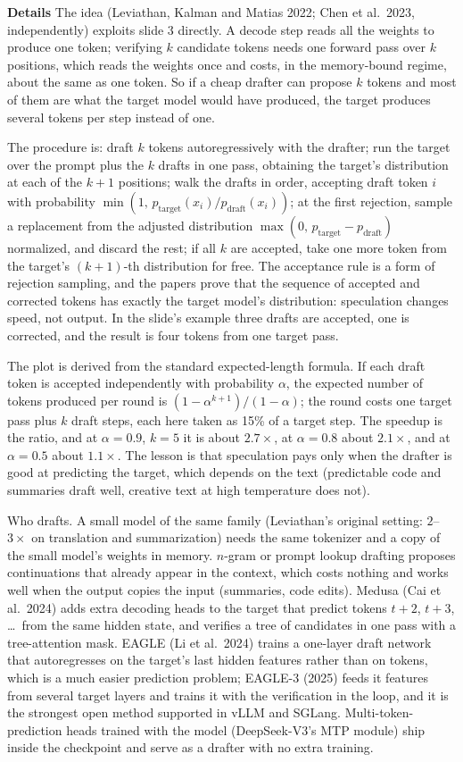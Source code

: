 \documentclass[11pt,letterpaper]{article}
\newcommand{\para}[1]{\medskip\noindent\textbf{#1}\quad}
\begin{document}
\para{Details} The idea (Leviathan, Kalman and Matias 2022; Chen et al.\ 2023, independently) exploits slide 3 directly. A decode step reads all the weights to produce one token; verifying $k$ candidate tokens needs one forward pass over $k$ positions, which reads the weights once and costs, in the memory-bound regime, about the same as one token. So if a cheap drafter can propose $k$ tokens and most of them are what the target model would have produced, the target produces several tokens per step instead of one.

The procedure is: draft $k$ tokens autoregressively with the drafter; run the target over the prompt plus the $k$ drafts in one pass, obtaining the target's distribution at each of the $k+1$ positions; walk the drafts in order, accepting draft token $i$ with probability $\min(1,\,p_{\text{target}}(x_i)/p_{\text{draft}}(x_i))$; at the first rejection, sample a replacement from the adjusted distribution $\max(0,\,p_{\text{target}}-p_{\text{draft}})$ normalized, and discard the rest; if all $k$ are accepted, take one more token from the target's $(k+1)$-th distribution for free. The acceptance rule is a form of rejection sampling, and the papers prove that the sequence of accepted and corrected tokens has exactly the target model's distribution: speculation changes speed, not output. In the slide's example three drafts are accepted, one is corrected, and the result is four tokens from one target pass.

The plot is derived from the standard expected-length formula. If each draft token is accepted independently with probability $\alpha$, the expected number of tokens produced per round is $(1-\alpha^{k+1})/(1-\alpha)$; the round costs one target pass plus $k$ draft steps, each here taken as 15\% of a target step. The speedup is the ratio, and at $\alpha=0.9$, $k=5$ it is about $2.7\times$, at $\alpha=0.8$ about $2.1\times$, and at $\alpha=0.5$ about $1.1\times$. The lesson is that speculation pays only when the drafter is good at predicting the target, which depends on the text (predictable code and summaries draft well, creative text at high temperature does not).

Who drafts. A small model of the same family (Leviathan's original setting: $2$--$3\times$ on translation and summarization) needs the same tokenizer and a copy of the small model's weights in memory. $n$-gram or prompt lookup drafting proposes continuations that already appear in the context, which costs nothing and works well when the output copies the input (summaries, code edits). Medusa (Cai et al.\ 2024) adds extra decoding heads to the target that predict tokens $t+2$, $t+3$, \ldots\ from the same hidden state, and verifies a tree of candidates in one pass with a tree-attention mask. EAGLE (Li et al.\ 2024) trains a one-layer draft network that autoregresses on the target's last hidden features rather than on tokens, which is a much easier prediction problem; EAGLE-3 (2025) feeds it features from several target layers and trains it with the verification in the loop, and it is the strongest open method supported in vLLM and SGLang. Multi-token-prediction heads trained with the model (DeepSeek-V3's MTP module) ship inside the checkpoint and serve as a drafter with no extra training.
\end{document}
